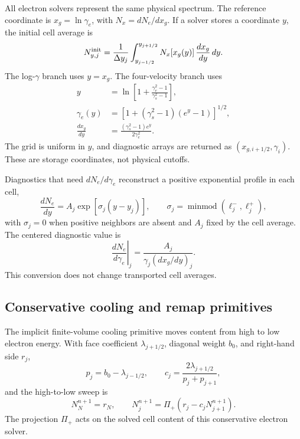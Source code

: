 \documentclass[twocolumn]{aastex702}
\begin{document}
All electron solvers represent the same physical spectrum.  The reference
coordinate is \(x_g=\ln\gamma_e\), with \(N_x=dN_e/dx_g\).  If a solver stores a
coordinate \(y\), the initial cell average is
\begin{equation}
N_{y,j}^{\rm init}=\frac{1}{\Delta y_j}
\int_{y_{j-1/2}}^{y_{j+1/2}}
N_x[x_g(y)]\,\frac{dx_g}{dy}\,dy .
\end{equation}
The log-\(\gamma\) branch uses \(y=x_g\).  The four-velocity branch uses
\begin{equation}
\begin{aligned}
y&=\ln\left[1+\frac{\gamma_e^2-1}{\gamma_s^2-1}\right],\\
\gamma_e(y)&=\left[1+(\gamma_s^2-1)(e^y-1)\right]^{1/2},\\
\frac{dx_g}{dy}&=
\frac{(\gamma_s^2-1)e^y}{2\gamma_e^2}.
\end{aligned}
\end{equation}
The grid is uniform in \(y\), and diagnostic arrays are returned as
\((x_{g,i+1/2},\gamma_i)\).  These are storage coordinates, not physical cutoffs.

Diagnostics that need \(dN_e/d\gamma_e\) reconstruct a positive exponential
profile in each cell,
\begin{equation}
\frac{dN_e}{dy}=A_j\exp[\sigma_j(y-y_j)],\qquad
\sigma_j=\operatorname{minmod}(\ell_j^-,\ell_j^+),
\end{equation}
with \(\sigma_j=0\) when positive neighbors are absent and \(A_j\) fixed by the
cell average.  The centered diagnostic value is
\begin{equation}
\left.\frac{dN_e}{d\gamma_e}\right|_j
=\frac{A_j}{\gamma_j(dx_g/dy)_j}.
\end{equation}
This conversion does not change transported cell averages.

\subsection{Conservative cooling and remap primitives}

The implicit finite-volume cooling primitive moves content from high to low
electron energy.  With face coefficient \(\lambda_{j+1/2}\), diagonal weight
\(b_0\), and right-hand side \(r_j\),
\begin{equation}
p_j=b_0-\lambda_{j-1/2},\qquad
c_j=\frac{2\lambda_{j+1/2}}{p_j+p_{j+1}},
\end{equation}
and the high-to-low sweep is
\begin{equation}
N_N^{n+1}=r_N,\qquad
N_j^{n+1}=\Pi_+\!\left(r_j-c_jN_{j+1}^{n+1}\right).
\label{eq:triangular-cooling-sweep}
\end{equation}
The projection \(\Pi_+\) acts on the solved cell content of this conservative
electron solver.
\end{document}
